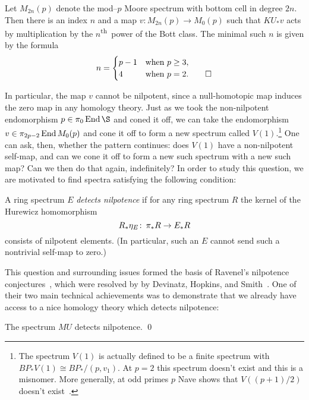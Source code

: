 \begin{theorem}\label{AdamsSelfMapThm}
Let $M_{2n}(p)$ denote the mod--$p$ Moore spectrum with bottom cell in degree $2n$.  Then there is an index $n$ and a map $v: M_{2n}(p) \to M_0(p)$ such that $KU_* v$ acts by multiplication by the $n$\textsuperscript{th}\, power of the Bott class.  The minimal such $n$ is given by the formula \[n = \begin{cases} p-1 & \text{when $p \ge 3$}, \\ 4 & \text{when $p = 2$}. \qed \end{cases}\]
\end{theorem}

\noindent In particular, the map $v$ cannot be nilpotent, since a null-homotopic map induces the zero map in any homology theory.  Just as we took the non-nilpotent endomorphism $p \in \pi_0 \End \S$ and coned it off, we can take the endomorphism $v \in \pi_{2p-2} \operatorname{End} M_0(p)$ and cone it off to form a new spectrum called $V(1)$.\footnote{The spectrum $V(1)$ is actually defined to be a finite spectrum with $BP_* V(1) \cong BP_* / (p, v_1)$. At $p = 2$ this spectrum doesn't exist and this is a misnomer.  More generally, at odd primes $p$ Nave shows that $V((p+1)/2)$ doesn't exist~\cite[Theorem 1.3]{Nave}.}  One can ask, then, whether the pattern continues: does $V(1)$ have a non-nilpotent self-map, and can we cone it off to form a new such spectrum with a new such map?  Can we then do that again, indefinitely?  In order to study this question, we are motivated to find spectra satisfying the following condition:

\begin{definition}
A ring spectrum $E$ \textit{detects nilpotence} if for any ring spectrum $R$ the kernel of the Hurewicz homomorphism \[R_*\eta_E\colon\thinspace \pi_* R \to E_* R\] consists of nilpotent elements.  (In particular, such an $E$ cannot send such a nontrivial self-map to zero.)
\end{definition}

This question and surrounding issues formed the basis of Ravenel's nilpotence conjectures~\cite[Section 10]{RavenelLocalizationWRTPeriodic}, which were resolved by by Devinatz, Hopkins, and Smith~\cite{DHS,HopkinsSmith}.  One of their two main technical achievements was to demonstrate that we already have access to a nice homology theory which detects nilpotence:

\begin{theorem}\label{DevinatzHopkinsSmith}
The spectrum $MU$ detects nilpotence. \qed
\end{theorem}

